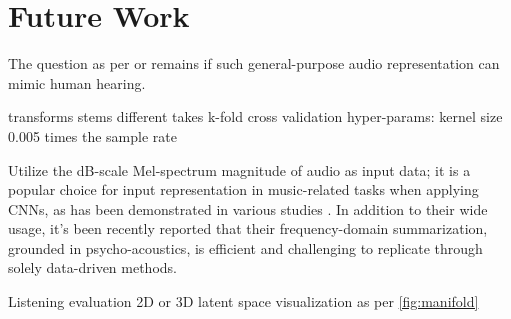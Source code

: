 \chapter{Future Work}

The question as per \cite{Turian2022HEAR:Representations} or \cite{Li2023MERT:Training} remains if such general-purpose audio representation can mimic human hearing.

transforms
stems
different takes
k-fold cross validation
hyper-params: kernel size 0.005 times the sample rate

Utilize the dB-scale Mel-spectrum magnitude of audio as input data; it is a popular choice for input representation in music-related tasks when applying CNNs, as has been demonstrated in various studies \cite{Kim2020OneStrategies}. In addition to their wide usage, it's been recently reported that their frequency-domain summarization, grounded in psycho-acoustics, is efficient and challenging to replicate through solely data-driven methods. \cite{Kim2020OneStrategies}

Listening evaluation
2D or 3D latent space visualization as per \ref{fig:manifold}



\newpage